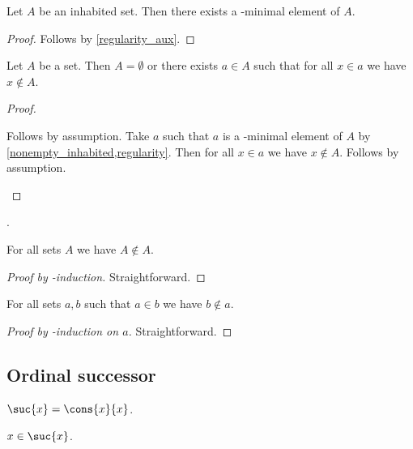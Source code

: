 \begin{proposition}[Regularity]%
\label{regularity}
    Let $A$ be an inhabited set.
    Then there exists a \in-minimal element of $A$.
\end{proposition}
\begin{proof}
    Follows by \cref{regularity_aux}.
\end{proof}


\begin{theorem}[Foundation]\label{foundation}
    Let $A$ be a set.
    Then $A = \emptyset$ or there exists $a\in A$
    such that for all $x\in a$ we have $x\notin A$.
\end{theorem}
\begin{proof}
    \begin{byCase}
            Follows by assumption.
            Take $a$ such that $a$ is a \in-minimal element of $A$ by \cref{nonempty_inhabited,regularity}.
            Then for all $x\in a$ we have $x\notin A$.
            Follows by assumption.
    \end{byCase}
\end{proof}.

\begin{proposition}\label{in_irrefl}
    For all sets $A$ we have $A\not\in A$.
\end{proposition}
\begin{proof}[Proof by \in-induction]
    Straightforward.
\end{proof}

\begin{proposition}\label{in_asymmetric}
    For all sets $a, b$ such that $a\in b$ we have $b\notin a$.
\end{proposition}
\begin{proof}[Proof by \in-induction on $a$]
    Straightforward.
\end{proof}

\subsection{Ordinal successor}

\begin{definition}\label{suc}
    $\suc{x} = \cons{x}{x}$.
\end{definition}

\begin{proposition}\label{suc_intro_self}
    $x\in\suc{x}$.
\end{proposition}

